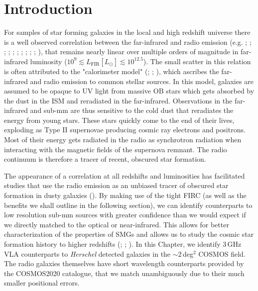 
\section{Introduction}

For samples of star forming galaxies in the local and high redshift universe there is a well observed correlation between the far-infrared and radio emission (e.g. \citealt{Dickey_1984}; \citealt{deJong_1985}; \citealt{Helou_1985}; \citealt{Condon_1992}; \citealt{Barger_2000}; \citealt{Yun_2001}; \citealt{Garrett_2002}; \citealt{Appleton_2004}; \citealt{Ibar_2008}; \citealt{Seymour_2009}; \citealt{Sargent_2010}), that remains nearly linear over multiple orders of magnitude in far-infrared luminosity ($10^{9} \lesssim L_{\textrm{FIR}} [L_{\odot}] \lesssim 10^{12.5}$). The small scatter in this relation is often attributed to the "calorimeter model" (\citealt{Voelk_1989}; \citealt{Lisenfeld_1996}; \citealt{Lacki_2010}), which ascribes the far-infrared and radio emission to common stellar sources. In this model, galaxies are assumed to be opaque to UV light from massive OB stars which gets absorbed by the dust in the ISM and reradiated in the far-infrared. Observations in the far-infrared and sub-mm are thus sensitive to the cold dust that reradiates the energy from young stars. These stars quickly come to the end of their lives, exploding as Type II supernovae producing cosmic ray electrons and positrons. Most of their energy gets radiated in the radio as synchrotron radiation when interacting with the magnetic fields of the supernova remnant. The radio continuum is therefore a tracer of recent, obscured star formation.

The appearance of a correlation at all redshifts and luminosities has facilitated studies that use the radio emission as an unbiased tracer of obscured star formation in dusty galaxies (\citealt{Kennicutt_2012}). By making use of the tight FIRC (as well as the benefits we shall outline in the following section), we can identify counterparts to low resolution sub-mm sources with greater confidence than we would expect if we directly matched to the optical or near-infrared. This allows for better characterization of the properties of SMGs and allows us to study the cosmic star formation history to higher redshifts (\citealt{Madau_2014}; \citealt{Delhaize_2017}; \citealt{Novak_2017}). In this Chapter, we identify $3\,$GHz VLA counterparts to \textit{Herschel} detected galaxies in the $\sim2\,$deg$^2$ COSMOS field. The radio galaxies themselves have short wavelength counterparts provided by the COSMOS2020 catalogue, that we match unambiguously due to their much smaller positional errors.

